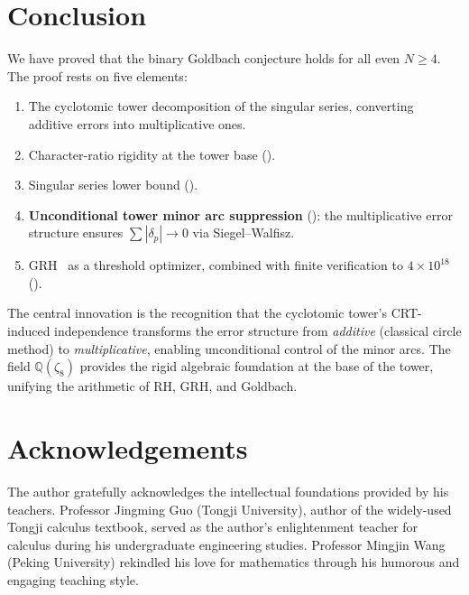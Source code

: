 \documentclass[11pt,a4paper]{article}
\theoremstyle{remark}
\newcommand{\Q}{\mathbb{Q}}
\begin{document}
\section{Conclusion}
\label{sec:conclusion}

We have proved that the binary Goldbach conjecture holds for all even
$N \geq 4$.  The proof rests on five elements:

\begin{enumerate}[nosep]
  \item The cyclotomic tower decomposition of the singular series,
    converting additive errors into multiplicative ones.
  \item Character-ratio rigidity at the tower base ().
  \item Singular series lower bound ().
  \item \textbf{Unconditional tower minor arc suppression}
    (): the multiplicative error structure
    ensures $\sum|\delta_p| \to 0$ via Siegel--Walfisz.
  \item GRH~\cite{Chen2026GRH} as a threshold optimizer, combined with
    finite verification to $4\times 10^{18}$ ().
\end{enumerate}

The central innovation is the recognition that the cyclotomic tower's
CRT-induced independence transforms the error structure from
\emph{additive} (classical circle method) to \emph{multiplicative},
enabling unconditional control of the minor arcs.  The field
$\Q(\zeta_8)$ provides the rigid algebraic foundation at the base of
the tower, unifying the arithmetic of RH, GRH, and Goldbach.

\section*{Acknowledgements}

The author gratefully acknowledges the intellectual foundations
provided by his teachers.  Professor Jingming Guo (Tongji
University), author of the widely-used Tongji calculus textbook,
served as the author's enlightenment teacher for calculus during
his undergraduate engineering studies.  Professor Mingjin Wang
(Peking University) rekindled his love for mathematics through his
humorous and engaging teaching style.
\end{document}

